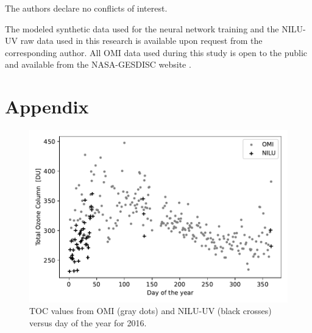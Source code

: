 \documentclass{optica-article}
\begin{document}
\begin{backmatter}
	


The authors declare no conflicts of interest.

The modeled synthetic data used for the neural network training and the NILU-UV raw data used in this research is available upon request from the corresponding author. All OMI data used during this study is open to the public and available from the NASA-GESDISC website \cite{NASA:gesdisc}.

\end{backmatter}

\section{Appendix}
\label{sec-appendix}

\begin{figure}[H]
	\centering
	\includegraphics[width=0.7\linewidth]{OMI_L3_NILU_O3_2016}
	\caption{TOC values from OMI (gray dots) and NILU-UV (black crosses) versus day of the year for 2016.}
	\label{fig:omil3niluo32016}
\end{figure}
\end{document}
